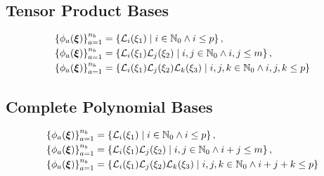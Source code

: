 \subsection{Tensor Product Bases}

\begin{equation}
\begin{aligned}
\left\{ \phi_a(\boldsymbol{\xi}) \right\}_{a=1}^{n_b} &=
  \left\{ \mathcal{L}_i(\xi_1) \; | \; i \in \mathbb{N}_0 \land i \leq p
  \right\}, \\
\left\{ \phi_a(\boldsymbol{\xi}) \right\}_{a=1}^{n_b} &=
  \left\{ \mathcal{L}_i(\xi_1) \mathcal{L}_j(\xi_2) \; | \; i,j \in
  \mathbb{N}_0 \land i,j \leq m \right\}, \\
\left\{ \phi_a(\boldsymbol{\xi}) \right\}_{a=1}^{n_b} &=
  \left\{ \mathcal{L}_i(\xi_1) \mathcal{L}_j(\xi_2) \mathcal{L}_k(\xi_3) \; |
  \; i,j,k \in \mathbb{N}_0 \land i,j,k \leq p \right\}
\end{aligned}
\label{eq:tensor_basis}
\end{equation}

\subsection{Complete Polynomial Bases}

\begin{equation}
\begin{aligned}
\left\{ \phi_a(\boldsymbol{\xi}) \right\}_{a=1}^{n_b} &=
  \left\{ \mathcal{L}_i(\xi_1) \; | \; i \in \mathbb{N}_0 \land i \leq p
  \right\}, \\
\left\{ \phi_a(\boldsymbol{\xi}) \right\}_{a=1}^{n_b} &=
  \left\{ \mathcal{L}_i(\xi_1) \mathcal{L}_j(\xi_2) \; | \; i,j \in
  \mathbb{N}_0 \land i + j \leq m \right\}, \\
\left\{ \phi_a(\boldsymbol{\xi}) \right\}_{a=1}^{n_b} &=
  \left\{ \mathcal{L}_i(\xi_1) \mathcal{L}_j(\xi_2) \mathcal{L}_k(\xi_3) \; |
  \; i,j,k \in \mathbb{N}_0 \land i + j + k \leq p \right\}
\end{aligned}
\label{eq:complete_basis}
\end{equation}

